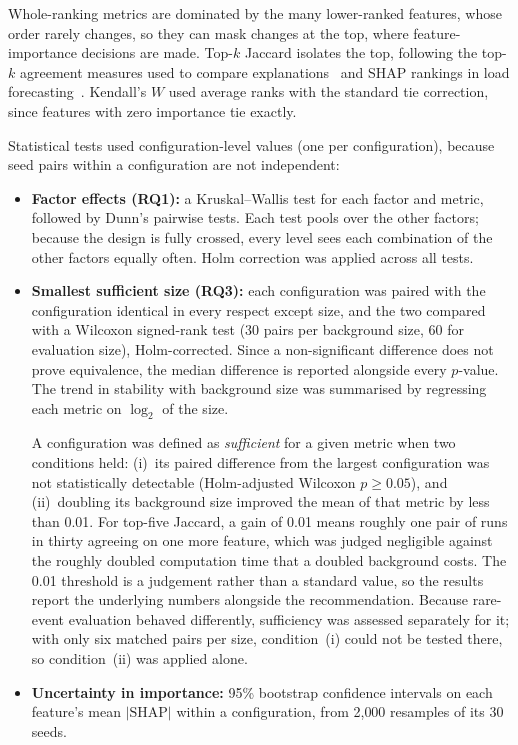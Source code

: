 \documentclass[11pt,a4paper]{article}
\begin{document}
Whole-ranking metrics are dominated by the many lower-ranked features, whose order rarely changes, so they can mask changes at the top, where feature-importance decisions are made. Top-$k$ Jaccard isolates the top, following the top-$k$ agreement measures used to compare explanations~\cite{krishna2022} and SHAP rankings in load forecasting~\cite{hao2026}. Kendall's $W$ used average ranks with the standard tie correction, since features with zero importance tie exactly.

Statistical tests used configuration-level values (one per configuration), because seed pairs within a configuration are not independent:
\begin{itemize}
  \item \textbf{Factor effects (RQ1):} a Kruskal--Wallis test for each factor and metric, followed by Dunn's pairwise tests. Each test pools over the other factors; because the design is fully crossed, every level sees each combination of the other factors equally often. Holm correction was applied across all tests.
  \item \textbf{Smallest sufficient size (RQ3):} each configuration was paired with the configuration identical in every respect except size, and the two compared with a Wilcoxon signed-rank test (30 pairs per background size, 60 for evaluation size), Holm-corrected. Since a non-significant difference does not prove equivalence, the median difference is reported alongside every $p$-value. The trend in stability with background size was summarised by regressing each metric on $\log_2$ of the size.

  A configuration was defined as \emph{sufficient} for a given metric when two conditions held: (i)~its paired difference from the largest configuration was not statistically detectable (Holm-adjusted Wilcoxon $p \ge 0.05$), and (ii)~doubling its background size improved the mean of that metric by less than 0.01. For top-five Jaccard, a gain of 0.01 means roughly one pair of runs in thirty agreeing on one more feature, which was judged negligible against the roughly doubled computation time that a doubled background costs. The 0.01 threshold is a judgement rather than a standard value, so the results report the underlying numbers alongside the recommendation. Because rare-event evaluation behaved differently, sufficiency was assessed separately for it; with only six matched pairs per size, condition~(i) could not be tested there, so condition~(ii) was applied alone.
  \item \textbf{Uncertainty in importance:} 95\% bootstrap confidence intervals on each feature's mean $|\text{SHAP}|$ within a configuration, from 2{,}000 resamples of its 30 seeds.
\end{itemize}
\end{document}
